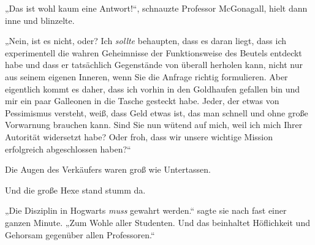 „Das ist wohl kaum eine Antwort!“, schnauzte Professor McGonagall, hielt dann inne und blinzelte.

„Nein, ist es nicht, oder? Ich \emph{sollte} behaupten, dass es daran liegt, dass ich experimentell die wahren Geheimnisse der Funktionsweise des Beutels entdeckt habe und dass er tatsächlich Gegenstände von überall herholen kann, nicht nur aus seinem eigenen Inneren, wenn Sie die Anfrage richtig formulieren. Aber eigentlich kommt es daher, dass ich vorhin in den Goldhaufen gefallen bin und mir ein paar Galleonen in die Tasche gesteckt habe.
Jeder, der etwas von Pessimismus versteht, weiß, dass Geld etwas ist, das man schnell und ohne große Vorwarnung brauchen kann. Sind Sie nun wütend auf mich, weil ich mich Ihrer Autorität widersetzt habe? Oder froh, dass wir unsere wichtige Mission erfolgreich abgeschlossen haben?“

Die Augen des Verkäufers waren groß wie Untertassen.

Und die große Hexe stand stumm da.

„Die Disziplin in Hogwarts \emph{muss} gewahrt werden.“ sagte sie nach fast einer ganzen Minute. „Zum Wohle aller Studenten. Und das beinhaltet Höflichkeit und Gehorsam gegenüber allen Professoren.“

